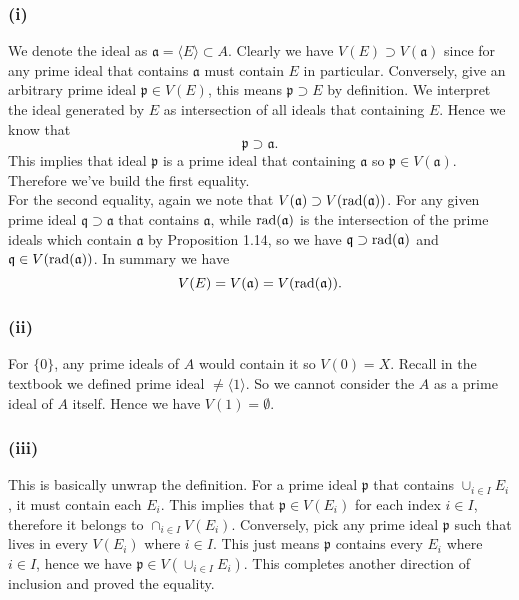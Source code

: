 \subsubsection{(i)}

We denote the ideal as $\mathfrak a=\langle E\rangle \subset A$.
Clearly we have $V(E)\supset V(\mathfrak a)$ since for any prime ideal that contains $\mathfrak a$ must contain $E$ in particular. Conversely, give an arbitrary prime ideal $\mathfrak p\in V(E)$, this means $\mathfrak p\supset E$ by definition. We interpret the ideal generated by $E$ as intersection of all ideals that containing $E$. Hence we know that 
$$\mathfrak p\supset \mathfrak a.$$ This implies that ideal $\mathfrak p$ is a prime ideal that containing $\mathfrak a$ so $\mathfrak p\in V(\mathfrak a)$. Therefore we've build the first equality.\\

\noindent For the second equality, again we note that $V(\mathfrak a)\supset V(\operatorname{rad}(\mathfrak a))$. For any given prime ideal $\mathfrak q\supset \mathfrak a$ that contains $\mathfrak a$, while $\operatorname{rad}(\mathfrak a)$ is the intersection of the prime ideals which contain $\mathfrak a$ by Proposition 1.14, so we have $\mathfrak q\supset \operatorname{rad}(\mathfrak a)$ and $\mathfrak q\in V(\operatorname{rad}(\mathfrak a))$. In summary we have 
$$V(E)=V(\mathfrak a)=V(\operatorname{rad}(\mathfrak a)).$$

\subsubsection{(ii)} For $\{0\}$, any prime ideals of $A$ would contain it so $V(0)=X$. Recall in the textbook we defined prime ideal $\neq \langle 1\rangle$. So we cannot consider the $A$ as a prime ideal of $A$ itself. Hence we have $V(1)=\emptyset$.\\

\subsubsection{(iii)} This is basically unwrap the definition. For a prime ideal $\mathfrak p$ that contains $\cup_{i\in I} E_i$, it must contain each $E_i$. This implies that $\mathfrak p\in V(E_i)$ for each index $i\in I$, therefore it belongs to $\cap _{i\in I} V(E_i)$. Conversely, pick any prime ideal $\mathfrak p$ such that lives in every $V(E_i)$ where $i\in I$. This just means $\mathfrak p$ contains every $E_i$ where $i\in I$, hence we have $\mathfrak p\in V(\cup_{i\in I} E_i)$. This completes another direction of inclusion and proved the equality.\\

